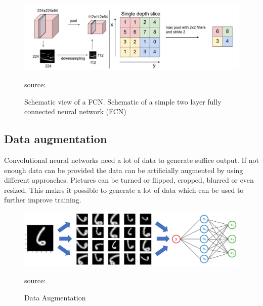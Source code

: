 \begin{figure}[H]
	\centering
	\includegraphics[width=\linewidth]{bilder/grundlagen/pooling.png}
	\caption{Schematic view of a FCN. Schematic of a simple two layer fully connected neural network (FCN)} source:\cite{Component}
	\label{fig:COMPONENT}
\end{figure}

\subsection{Data augmentation}
Convolutional neural networks need a lot of data to generate suffice output. If not enough data can be provided the data can be artificially augmented by using different approaches. Pictures can be turned or flipped, cropped, blurred or even resized. This makes it possible to generate a lot of data which can be used to further improve training.

\begin{figure}[H]
	\centering
	\includegraphics[width=\linewidth]{bilder/deep_learning/data_aug_basic.png}
	\caption{Data Augmentation} source:\cite{Component}
	\label{fig:COMPONENT}
\end{figure}
